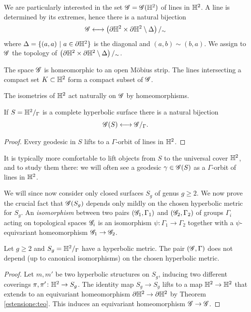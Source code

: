 We are particularly interested in the set $\mathscr{G} = \mathscr{G}(\mathbb{H}^2)$ of lines in $\mathbb{H}^2$. A line is determined by its extremes, hence there is a natural bijection 
$$\mathscr{G} \longleftrightarrow \left(\partial \mathbb{H}^2 \times \partial \mathbb{H}^2\setminus \Delta\right)/_\sim$$
where $\Delta = \{(a,a)\ |\ a\in\partial\matH^2\}$ is the diagonal and $(a,b) \sim (b,a)$. We assign to $\mathscr{G}$ the topology of $\left(\partial \mathbb{H}^2 \times \partial \mathbb{H}^2\setminus \Delta\right)/_\sim$. 
\begin{ex} \label{Mobius:ex}
The space $\mathscr{G}$ is homeomorphic to an open M\"obius strip. The lines intersecting a compact set $K\subset \mathbb{H}^2$ form a compact subset of $\mathscr{G}$.
\end{ex}
The isometries of $\mathbb{H}^2$ act naturally on $\mathscr{G}$ by homeomorphisms.
\begin{prop}
If $S=\mathbb{H}^2/_\Gamma$ is a complete hyperbolic surface there is a natural bijection
$$\mathscr{G}(S) \longleftrightarrow \mathscr{G}/_\Gamma.$$
\end{prop}
\begin{proof}
Every geodesic in $S$ lifts to a $\Gamma$-orbit of lines in $\mathbb{H}^2$.
\end{proof}

It is typically more comfortable to lift objects from $S$ to the universal cover $\mathbb{H}^2$, and to study them there: we will often see a geodesic $\gamma\in\mathscr{G}(S)$ as a $\Gamma$-orbit of lines in $\mathbb{H}^2$. 

We will since now consider only closed surfaces $S_g$ of genus $g\geqslant 2$.
We now prove the crucial fact that $\mathscr{G}(S_g)$ depends only mildly on the chosen hyperbolic metric for $S_g$. 
An \emph{isomorphism} between two pairs $(\mathscr{G}_1, \Gamma_1)$ and $(\mathscr{G}_2, \Gamma_2)$ of groups $\Gamma_i$ acting on topological spaces $\mathscr{G}_i$ is an isomorphism $\psi\colon\Gamma_1\to \Gamma_2$ together with a $\psi$-equivariant homeomorphism $\mathscr{G}_1\to \mathscr{G}_2$.

\begin{prop}
Let $g\geqslant 2$ and $S_g = \mathbb{H}^2/_\Gamma$ have a hyperbolic metric. The pair $(\mathscr{G}, \Gamma)$ does not depend (up to canonical isomorphisms) on the chosen hyperbolic metric.
\end{prop}
\begin{proof}
Let $m,m'$ be two hyperbolic structures on $S_g$, inducing two different coverings $\pi, \pi' \colon \mathbb{H}^2 \to S_g$. The identity map $S_g\to S_g$ lifts to a map $\mathbb{H}^2 \to \mathbb{H}^2$ that extends to an equivariant homeomorphism $\partial \mathbb{H}^2 \to \partial \mathbb{H}^2$ by Theorem \ref{estensione:teo}. This induces an equivariant homeomorphism $\mathscr{G} \to \mathscr{G}$.
\end{proof}

